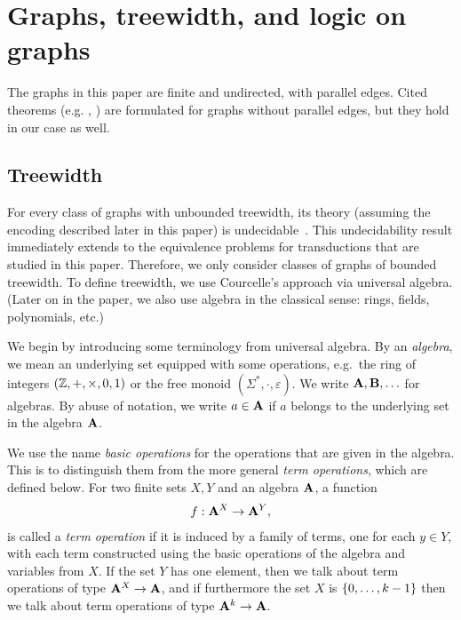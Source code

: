 \section{Graphs, treewidth, and logic on graphs}
The graphs in this paper are finite and undirected, with parallel edges. Cited theorems (e.g. \cite[Proposition 4.1]{courcelleEtAlAlgebraicTheoryOfGraphReduction93}, \cite[Theorem 2]{groheDellRattan2018}) are formulated for graphs without parallel edges, but they hold in our case as well.

\subsection{Treewidth} 
\label{sec:treewidth-definition}
For every class of graphs with unbounded treewidth, its \mso theory (assuming the \msotwo encoding described later in this paper) is undecidable~\cite[Theorem 8]{seese1991structure}. This undecidability result immediately extends to the equivalence problems for \mso transductions that are studied in this paper. Therefore, we  only consider classes of graphs of bounded treewidth. 
To define treewidth, we use Courcelle's  approach via universal algebra. (Later on in the paper, we also use algebra in the classical sense: rings, fields, polynomials, etc.)


 We begin by introducing some terminology from universal algebra. By an \emph{algebra}, we mean an underlying set equipped with some  operations, e.g.~the ring of integers $(\mathbb Z, + , \times, 0, 1)$ or the free monoid $(\Sigma^*, \cdot, \varepsilon)$. We write $\mathbf{A}, \mathbf{B}, \ldots$ for algebras. By abuse of notation, we write $a \in \mathbf{A}$ if $a$ belongs to the underlying set in the algebra $\mathbf{A}$. 

We use the name \emph{basic operations} for the operations that are given in the algebra. This is to distinguish them from the more general \emph{term operations}, which are defined below.
        For two finite sets $X,Y$ and an algebra $\mathbf{A}$, a function
        \begin{align*}
            f : \mathbf{A}^X \to \mathbf{A}^Y,
            \end{align*}
            is called a \emph{term operation} if it is induced by a family of terms, one for each $y \in Y$, with each term  constructed using the basic operations of the algebra and variables from $X$.  If the set $Y$ has one element, then we talk about term operations of type $\mathbf{A}^X \to 
        \mathbf{A}$, and if furthermore the set $X$ is $\{0,\ldots,k-1\}$ then we talk about term operations of type $\mathbf{A}^k \to \mathbf{A}$. 

